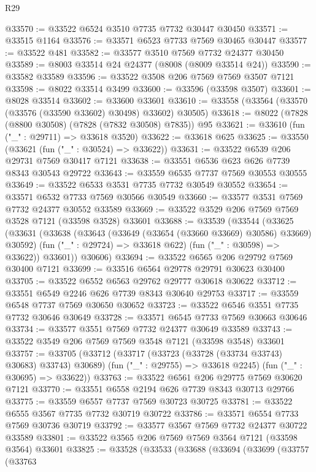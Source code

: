 \begin{lexlean}{R29}
\begin{coremodule}
@33570 := @33522 @6524 @3510 @7735 @7732 @30447 @30450
@33571 := @33515 @1164
@33576 := @33571 @6523 @7733 @7569 @30465 @30447
@33577 := @33522 @481
@33582 := @33577 @3510 @7569 @7732 @24377 @30450
@33589 := @8003 @33514 @24 @24377 (@8008 (@8009 @33514 @24))
@33590 := @33582 @33589
@33596 := @33522 @3508 @206 @7569 @7569 @3507 @7121
@33598 := @8022 @33514 @3499
@33600 := @33596 (@33598 @3507)
@33601 := @8028 @33514
@33602 := @33600 @33601
@33610 := @33558 (@33564 (@33570 (@33576 (@33590 @33602) @30498) @33602) @30505)
@33618 := @8022 (@7828 (@8800 @30508) (@7828 (@7832 @30508) @7835)) @95
@33621 := @33610 (fun ("_" : @29711) => @33618 @3520)
@33622 := @33618 @625
@33625 := @33550 (@33621 (fun ("_" : @30524) => @33622))
@33631 := @33522 @6539 @206 @29731 @7569 @30417 @7121
@33638 := @33551 @6536 @623 @626 @7739 @8343 @30543 @29722
@33643 := @33559 @6535 @7737 @7569 @30553 @30555
@33649 := @33522 @6533 @3531 @7735 @7732 @30549 @30552
@33654 := @33571 @6532 @7733 @7569 @30566 @30549
@33660 := @33577 @3531 @7569 @7732 @24377 @30552 @33589
@33669 := @33522 @3529 @206 @7569 @7569 @3528 @7121 (@33598 @3528) @33601
@33688 := @33539
    (@33544
      (@33625
        (@33631
          (@33638
            (@33643 (@33649 (@33654 (@33660 @33669) @30586) @33669) @30592)
            (fun ("_" : @29724) => @33618 @622)
            (fun ("_" : @30598) => @33622))
          @33601))
      @30606)
@33694 := @33522 @6565 @206 @29792 @7569 @30400 @7121
@33699 := @33516 @6564 @29778 @29791 @30623 @30400
@33705 := @33522 @6552 @6563 @29762 @29777 @30618 @30622
@33712 := @33551 @6549 @2246 @626 @7739 @8343 @30640 @29753
@33717 := @33559 @6548 @7737 @7569 @30650 @30652
@33723 := @33522 @6546 @3551 @7735 @7732 @30646 @30649
@33728 := @33571 @6545 @7733 @7569 @30663 @30646
@33734 := @33577 @3551 @7569 @7732 @24377 @30649 @33589
@33743 := @33522 @3549 @206 @7569 @7569 @3548 @7121 (@33598 @3548) @33601
@33757 := @33705
    (@33712
      (@33717 (@33723 (@33728 (@33734 @33743) @30683) @33743) @30689)
      (fun ("_" : @29755) => @33618 @2245)
      (fun ("_" : @30695) => @33622))
@33763 := @33522 @6561 @206 @29775 @7569 @30620 @7121
@33770 := @33551 @6558 @2194 @626 @7739 @8343 @30713 @29766
@33775 := @33559 @6557 @7737 @7569 @30723 @30725
@33781 := @33522 @6555 @3567 @7735 @7732 @30719 @30722
@33786 := @33571 @6554 @7733 @7569 @30736 @30719
@33792 := @33577 @3567 @7569 @7732 @24377 @30722 @33589
@33801 := @33522 @3565 @206 @7569 @7569 @3564 @7121 (@33598 @3564) @33601
@33825 := @33528
    (@33533
      (@33688
        (@33694
          (@33699
            (@33757
              (@33763

\end{coremodule}
\end{lexlean}
